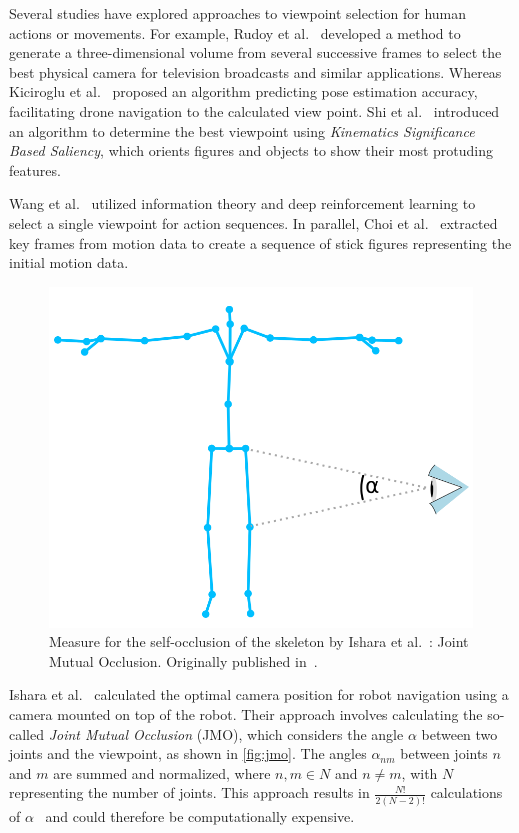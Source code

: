 Several studies have explored approaches to viewpoint selection for human actions or movements. For example, Rudoy et al.~\cite{rudoy2011vsh} developed a method to generate a three-dimensional volume from several successive frames to select the best physical camera for television broadcasts and similar applications. Whereas Kiciroglu et al.~\cite{kiciroglu2020amc} proposed an algorithm predicting pose estimation accuracy, facilitating drone navigation to the calculated view point. Shi et al.~\cite{shi2012ksb} introduced an algorithm to determine the best viewpoint using \emph{Kinematics Significance Based Saliency}, which orients figures and objects to show their most protuding features.

Wang et al.~\cite{wang2019asw} utilized information theory and deep reinforcement learning to select a single viewpoint for action sequences. In parallel, Choi et al.~\cite{choi2012rav} extracted key frames from motion data to create a sequence of stick figures representing the initial motion data.

\begin{figure}[ht]
	\centering
	\includegraphics[width=0.5\linewidth]{pictures/skeleton_E_occ.png}
	\caption{Measure for the self-occlusion of the skeleton by Ishara et al.~\cite{ishara2015mra}: Joint Mutual Occlusion. Originally published in~\cite{diller2024automatic}.}
	\label{fig:jmo}
\end{figure}

Ishara et al.~\cite{ishara2015mra} calculated the optimal camera position for robot navigation using a camera mounted on top of the robot. Their approach involves calculating the so-called \emph{Joint Mutual Occlusion} (JMO), which considers the angle \(\alpha\) between two joints and the viewpoint, as shown in \autoref{fig:jmo}. The angles \(\alpha_{nm}\) between joints \(n\) and \(m\) are summed and normalized, where \(n,m \in N\) and \(n \neq m\), with \(N\) representing the number of joints. This approach results in \(\frac{N!}{2(N-2)!}\) calculations of \(\alpha\)~\cite{charalambides2002enumerative} and could therefore be computationally expensive. 

